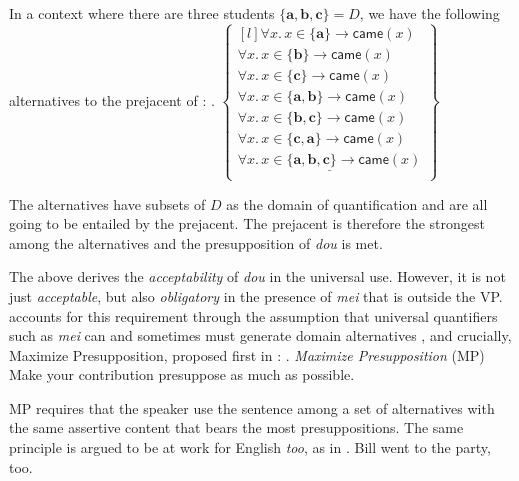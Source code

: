 \documentclass[12pt]{article}
\begin{document}
In a context where there are three students \(\{ \mathbf{a},\mathbf{b},\mathbf{c} \} = D\), we have the following alternatives to the prejacent of \Last:
\ex.
\(\begin{Bmatrix*}[l]
	\forall x.\, x \in \{ \mathbf{a} \} \to \mathsf{came}(x) \\
	\forall x.\, x \in \{ \mathbf{b} \} \to \mathsf{came}(x) \\
	\forall x.\, x \in \{ \mathbf{c} \} \to \mathsf{came}(x) \\
	\forall x.\, x \in \{ \mathbf{a}, \mathbf{b} \} \to \mathsf{came}(x) \\
	\forall x.\, x \in \{ \mathbf{b}, \mathbf{c} \} \to \mathsf{came}(x) \\
	\forall x.\, x \in \{ \mathbf{c}, \mathbf{a} \} \to \mathsf{came}(x) \\
	\underline{\forall x.\, x \in \{ \mathbf{a}, \mathbf{b}, \mathbf{c} \} \to \mathsf{came}(x)} \\
\end{Bmatrix*}\)

The alternatives have subsets of \(D\) as the domain of quantification and are all going to be entailed by the prejacent.
The prejacent is therefore the strongest among the alternatives and the presupposition of \emph{dou} is met.

The above derives the \emph{acceptability} of \emph{dou} in the universal use.
However, it is not just \emph{acceptable}, but also \emph{obligatory} in the presence of \emph{mei} that is outside the VP.
\citet{liuPragmaticExplanationMeidou2021} accounts for this requirement through the assumption that universal quantifiers such as \emph{mei} can and sometimes must generate domain alternatives \citep{chierchiaLogicGrammarPolarity2013,xiangFunctionAlternationsMandarin2020}, and crucially, Maximize Presupposition, proposed first in \citet{heimArtikelUndDefinitheit1991}:
\ex. \emph{Maximize Presupposition} (MP)\\
Make your contribution presuppose as much as possible. \label{itm:mp}

MP requires that the speaker use the sentence among a set of alternatives with the same assertive content that bears the most presuppositions.
The same principle is argued to be at work for English \emph{too}, as in
\ex. Bill went to the party, too.
\end{document}
